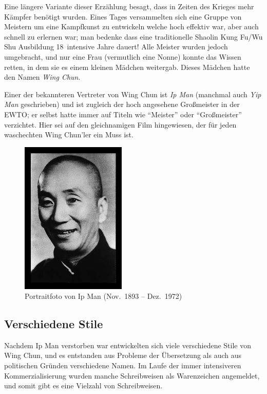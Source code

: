 \documentclass[a4paper,12pt]{scrartcl}
\begin{document}
Eine l\"angere Variante dieser Erz\"ahlung besagt, dass in Zeiten des Krieges mehr K\"ampfer ben\"otigt wurden. Eines Tages versammelten sich eine Gruppe von Meistern um eine Kampfkunst zu entwickeln welche hoch effektiv war, aber auch schnell zu erlernen war; man bedenke dass eine traditionelle Shaolin Kung Fu/Wu Shu Ausbildung 18~intensive Jahre dauert! Alle Meister wurden jedoch umgebracht, und nur eine Frau (vermutlich eine Nonne) konnte das Wissen retten, in dem sie es einem kleinen M\"adchen weitergab. Dieses M\"adchen hatte den Namen \textit{Wing Chun}.

Einer der bekannteren Vertreter von Wing Chun ist \textit{Ip Man} (manchmal auch \textit{Yip Man} geschrieben) und ist zugleich der hoch angesehene Gro{\ss}meister in der EWTO; er selbst hatte immer auf Titeln wie ``Meister'' oder ``Gro{\ss}meister'' verzichtet. Hier sei auf den gleichnamigen Film hingewiesen, der f\"ur jeden waschechten Wing Chun'ler ein Muss ist.

\begin{figure}[htbp]
	\centering
	\includegraphics[width=5cm]{image/ip_man}
	\caption{Portraitfoto von Ip Man (Nov.~1893 -- Dez.~1972)}
	\label{img:ip_man}
\end{figure}


\subsection{Verschiedene Stile}\label{sec:verschstile}

Nachdem Ip Man verstorben war entwickelten sich viele verschiedene Stile von Wing Chun, und es entstanden aus Probleme der \"Ubersetzung als auch aus politischen Gr\"unden verschiedene Namen. Im Laufe der immer intensiveren Kommerzialisierung wurden manche Schreibweisen als Warenzeichen angemeldet, und somit gibt es eine Vielzahl von Schreibweisen.
\end{document}

